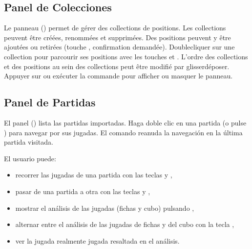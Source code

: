 \documentclass[letterpaper,10pt,spanish]{sphinxmanual}
\begin{document}
\subsection{Panel de Colecciones}
\label{\detokenize{manuel:panneau-collections}}\label{\detokenize{manuel:id6}}
\sphinxAtStartPar
Le panneau  () permet de gérer des collections de
positions. Les collections peuvent être créées, renommées et supprimées. Des
positions peuvent y être ajoutées ou retirées (touche , confirmation
demandée). Double\sphinxhyphen{}cliquer sur une collection pour parcourir ses positions
avec les touches  et . L’ordre des collections et des
positions au sein des collections peut être modifié par glisser\sphinxhyphen{}déposer.
Appuyer sur  ou exécuter la commande  pour afficher ou
masquer le panneau.


\subsection{Panel de Partidas}
\label{\detokenize{manuel:panneau-matchs}}\label{\detokenize{manuel:id7}}
\sphinxAtStartPar
El panel  () lista las partidas importadas. Haga doble clic en una partida (o pulse ) para navegar por sus jugadas. El comando  reanuda la navegación en la última partida visitada.

\sphinxAtStartPar
El usuario puede:
\begin{itemize}
\item {} 
\sphinxAtStartPar
recorrer las jugadas de una partida con las teclas  y ,

\item {} 
\sphinxAtStartPar
pasar de una partida a otra con las teclas  y ,

\item {} 
\sphinxAtStartPar
mostrar el análisis de las jugadas (fichas y cubo) pulsando ,

\item {} 
\sphinxAtStartPar
alternar entre el análisis de las jugadas de fichas y del cubo con la tecla ,

\item {} 
\sphinxAtStartPar
ver la jugada realmente jugada resaltada en el análisis.

\end{itemize}
\end{document}
